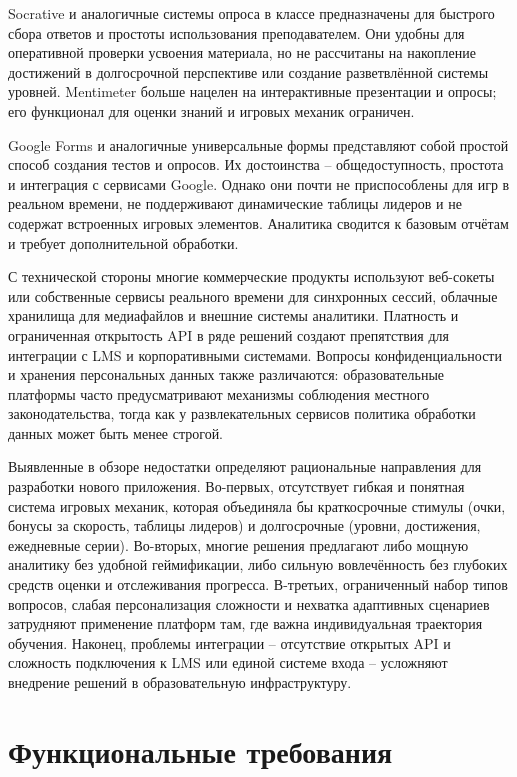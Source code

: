 \documentclass[14pt,a4paper]{extreport}
\begin{document}
Socrative и аналогичные системы опроса в классе предназначены для быстрого сбора ответов и простоты использования преподавателем. Они удобны для оперативной проверки усвоения материала, но не рассчитаны на накопление достижений в долгосрочной перспективе или создание разветвлённой системы уровней. Mentimeter \cite{mentimeter} больше нацелен на интерактивные презентации и опросы; его функционал для оценки знаний и игровых механик ограничен.

Google Forms и аналогичные универсальные формы представляют собой простой способ создания тестов и опросов. Их достоинства -- общедоступность, простота и интеграция с сервисами Google. Однако они почти не приспособлены для игр в реальном времени, не поддерживают динамические таблицы лидеров и не содержат встроенных игровых элементов. Аналитика сводится к базовым отчётам и требует дополнительной обработки.

С технической стороны многие коммерческие продукты используют веб-сокеты или собственные сервисы реального времени для синхронных сессий, облачные хранилища для медиафайлов и внешние системы аналитики. Платность и ограниченная открытость API в ряде решений создают препятствия для интеграции с LMS и корпоративными системами. Вопросы конфиденциальности и хранения персональных данных также различаются: образовательные платформы часто предусматривают механизмы соблюдения местного законодательства, тогда как у развлекательных сервисов политика обработки данных может быть менее строгой.

Выявленные в обзоре недостатки определяют рациональные направления для разработки нового приложения. Во-первых, отсутствует гибкая и понятная система игровых механик, которая объединяла бы краткосрочные стимулы (очки, бонусы за скорость, таблицы лидеров) и долгосрочные (уровни, достижения, ежедневные серии). Во-вторых, многие решения предлагают либо мощную аналитику без удобной геймификации, либо сильную вовлечённость без глубоких средств оценки и отслеживания прогресса. В-третьих, ограниченный набор типов вопросов, слабая персонализация сложности и нехватка адаптивных сценариев затрудняют применение платформ там, где важна индивидуальная траектория обучения. Наконец, проблемы интеграции -- отсутствие открытых API и сложность подключения к LMS или единой системе входа -- усложняют внедрение решений в образовательную инфраструктуру.

\section{Функциональные требования}
\end{document}
